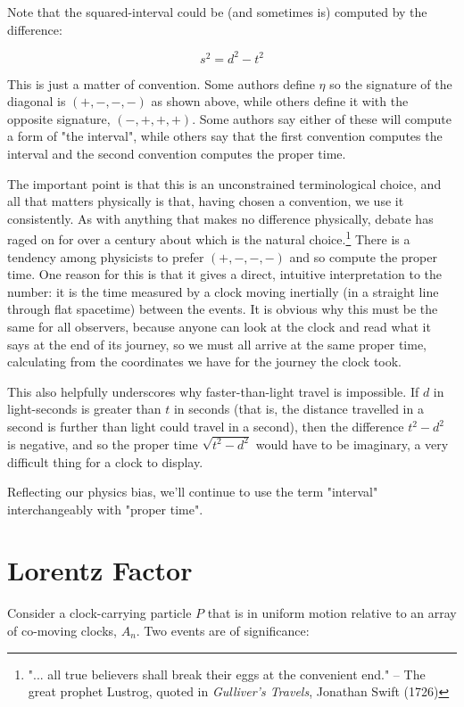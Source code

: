 Note that the squared-interval could be (and sometimes is) computed by the difference:

$$s^2 = d^2 - t^2$$

This is just a matter of convention. Some authors define $\eta$ so the signature of the diagonal is $(+, -, -, -)$ as shown above, while others define it with the opposite signature, $(-, +, +, +)$. Some authors say either of these will compute a form of "the interval", while others say that the first convention computes the interval and the second convention computes the proper time.

The important point is that this is an unconstrained terminological choice, and all that matters physically is that, having chosen a convention, we use it consistently. As with anything that makes no difference physically, debate has raged on for over a century about which is the natural choice.\footnote{"... all true believers shall break their eggs at the convenient end." -- The great prophet Lustrog, quoted in \textit{Gulliver's Travels}, Jonathan Swift (1726)} There is a tendency among physicists to prefer $(+, -, -, -)$ and so compute the proper time. One reason for this is that it gives a direct, intuitive interpretation to the number: it is the time measured by a clock moving inertially (in a straight line through flat spacetime) between the events. It is obvious why this must be the same for all observers, because anyone can look at the clock and read what it says at the end of its journey, so we must all arrive at the same proper time, calculating from the coordinates we have for the journey the clock took.

This also helpfully underscores why faster-than-light travel is impossible. If $d$ in light-seconds is greater than $t$ in seconds (that is, the distance travelled in a second is further than light could travel in a second), then the difference $t^2 - d^2$ is negative, and so the proper time $\sqrt{t^2 - d^2}$ would have to be imaginary, a very difficult thing for a clock to display.

Reflecting our physics bias, we'll continue to use the term "interval" interchangeably with "proper time".

\section{Lorentz Factor}

Consider a clock-carrying particle $P$ that is in uniform motion relative to an array of co-moving clocks, $A_n$. Two events are of significance:

